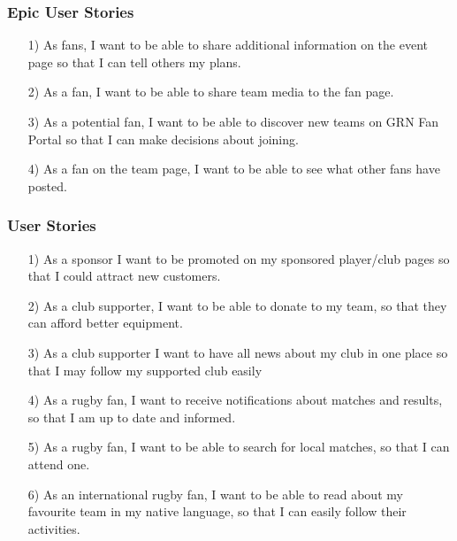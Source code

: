 \documentclass[10pt,a4paper]{article}
\begin{document}
\subsubsection{Epic User Stories}
\begin{itemize}


\item[1)]
As fans, I want to be able to share additional information on the event page so that I can tell others my plans.
\item[2)]
As a fan, I want to be able to share team media to the fan page.
\item[3)]
As a potential fan, I want to be able to discover new teams on GRN Fan Portal so that I can make decisions about joining.
\item[4)]
As a fan on the team page, I want to be able to see what other fans have posted.


\end{itemize}

\subsubsection{User Stories}

\begin{itemize}

\item[1)]
As a sponsor
I want to be promoted on my sponsored player/club pages
so that I could attract new customers.

\item[2)]
As a club supporter,
I want to be able to donate to my team,
so that they can afford better equipment.

\item[3)]
As a club supporter
I want to have all news about my club in one place
so that I may follow my supported club easily

\item[4)]
As a rugby fan,
I want to receive notifications about matches and results,
so that I am up to date and informed.

\item[5)]
As a rugby fan,
I want to be able to search for local matches,
so that I can attend one.

\item[6)]
As an international rugby fan,
I want to be able to read about my favourite team in my native language,
so that I can easily follow their activities.

\end{itemize}
\end{document}
